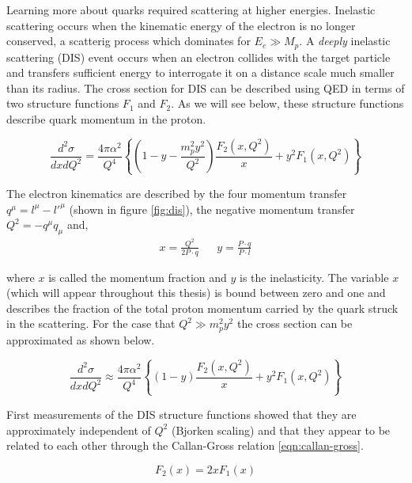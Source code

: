Learning more about quarks required scattering at higher energies.  Inelastic scattering occurs when the kinematic energy of the electron is no longer conserved, a scatterig process which dominates for $E_e \gg M_p$.  A \textit{deeply} inelastic scattering (DIS) event occurs when an electron collides with the target particle and transfers sufficient energy to interrogate it on a distance scale much smaller than its radius.  The cross section for DIS can be described using QED in terms of two structure functions $F_1$ and $F_2$.  As we will see below, these structure functions describe quark momentum in the proton.

\begin{equation}
	\label{eqn:sfs}
	\frac{d^2\sigma}{dx dQ^2} = \frac{4 \pi \alpha^2}{Q^4} \left\lbrace \left( 1 - y - \frac{m_p^2 y^2}{Q^2} \right) \frac{F_2(x,Q^2)}{x} + y^2 F_1 (x,Q^2) \right\rbrace
\end{equation}

The electron kinematics are described by the four momentum transfer $q^{\mu} = l^{\mu} - l'^{\mu}$ (shown in figure \ref{fig:dis}), the negative momentum transfer $Q^2 = - q^{\mu} q_{\mu}$ and,
\begin{align}  
  x = \frac{Q^{2}}{2P \cdot q} && y = \frac{P \cdot q}{P \cdot l} 
\end{align}

where $x$ is called the momentum fraction and $y$ is the inelasticity.  The variable $x$ (which will appear throughout this thesis) is bound between zero and one and describes the fraction of the total proton momentum carried by the quark struck in the scattering.  For the case that $Q^2 \gg m_p^2 y^2$ the cross section can be approximated as shown below.

\begin{equation}
	\label{eqn:sfs2}
	\frac{d^2\sigma}{dx dQ^2} \approx \frac{4 \pi \alpha^2}{Q^4} \left\lbrace \left( 1 - y \right) \frac{F_2(x,Q^2)}{x} + y^2 F_1 (x,Q^2) \right\rbrace
\end{equation}

First measurements of the DIS structure functions \cite{history-bjorken:1969} showed that they are approximately independent of $Q^2$ (Bjorken scaling) and that they appear to be related to each other through the Callan-Gross relation \ref{eqn:callan-gross}.

\begin{equation}	
	F_{2} (x) = 2xF_1 (x)
	\label{eqn:callan-gross}
\end{equation}

